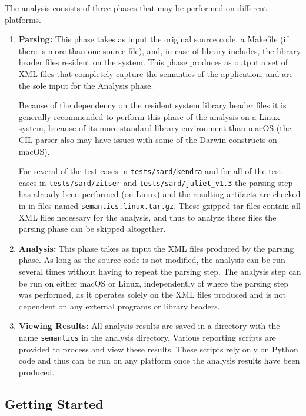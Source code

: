 \documentclass[11pt]{article}
\begin{document}
The analysis consists of three phases that may be performed on different platforms.
\begin{enumerate}
\item {\bf Parsing:} This phase takes as input the original source code, a Makefile 
  (if there is more than one source file), and, in case of library includes, the 
  library header files resident on the system. This phase produces as output a set 
  of XML files that completely capture the semantics of the application, and are 
  the sole input for the Analysis phase. \vspace{1em}

  Because of the dependency on the resident system library header files it is 
  generally recommended to perform this phase of the analysis on a Linux system, 
  because of its more standard library environment than macOS (the CIL parser 
  also may have issues with some of the Darwin constructs on macOS). \vspace{1em}
  
  For several of the test cases in {\tt tests/sard/kendra} and for all of the test cases 
  in {\tt tests/sard/zitser} and {\tt tests/sard/juliet\_v1.3} the parsing step has 
  already been performed (on Linux) 
  and the resulting artifacts are checked in in files named {\tt semantics\-.linux\-.tar.gz}. These 
  gzipped tar files contain all XML files necessary for the analysis, and thus 
  to analyze these files the parsing phase can be skipped altogether.
  
\item {\bf Analysis:} This phase takes as input the XML files produced by the parsing 
  phase. As long as the source code is not modified, the analysis can be run several 
  times without having to repeat the parsing step. The analysis step can be run on 
  either macOS or Linux, independently of where the parsing step was performed, as 
  it operates solely on the XML files produced and is not dependent on any external 
  programs or library headers.
  
\item {\bf Viewing Results:} All analysis results are saved in a directory with the name
  {\tt semantics} in the analysis directory. Various reporting scripts are provided to
  process and view these results. These scripts rely only on Python code and thus can
  be run on any platform once the analysis results have been produced.
\end{enumerate}

\subsection{Getting Started}
\label{sec:getstarted}
\end{document}
